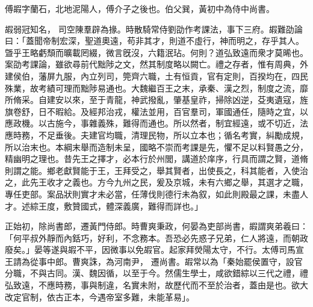 \begin{pinyinscope}
 
 
 傅嘏字蘭石，北地泥陽人，傅介子之後也。伯父巽，黃初中為侍中尚書。
 
 
 嘏弱冠知名，
 司空陳羣辟為掾。時散騎常侍劉劭作考課法，事下三府。嘏難劭論曰：「蓋聞帝制宏深，聖道奧遠，苟非其才，則道不虛行，神而明之，存乎其人。曁乎王略虧頹而曠載罔綴，微言旣沒，六籍泯玷。何則？道弘致遠而衆才莫晞也。案劭考課論，雖欲尋前代黜陟之文，然其制度略以闕亡。禮之存者，惟有周典，外建侯伯，藩屏九服，內立列司，筦齊六職，土有恒貢，官有定則，百揆均在，四民殊業，故考績可理而黜陟易通也。大魏繼百王之末，承秦、漢之烈，制度之流，靡所脩采。自建安以來，至于青龍，神武撥亂，肇基皇祚，掃除凶逆，芟夷遺寇，旌旗卷舒，日不暇給。及經邦治戎，權法並用，百官羣司，軍國通任，隨時之宜，以應政機。以古施今，事雜義殊，難得而通也。所以然者，制宜經遠，或不切近，法應時務，不足垂後。夫建官均職，清理民物，所以立本也；循名考實，糾勵成規，所以治末也。本綱末舉而造制未呈，國略不崇而考課是先，懼不足以料賢愚之分，精幽明之理也。昔先王之擇才，必本行於州閭，講道於庠序，行具而謂之賢，道脩則謂之能。鄉老獻賢能于王，王拜受之，舉其賢者，出使長之，科其能者，入使治之，此先王收才之義也。方今九州之民，爰及京城，未有六鄉之舉，其選才之職，專任吏部。案品狀則實才未必當，任薄伐則德行未為叙，如此則殿最之課，未盡人才。述綜王度，敷贊國式，體深義廣，難得而詳也。」
 
 
正始初，除尚書郎，遷黃門侍郎。時曹爽秉政，何晏為吏部尚書，嘏謂爽弟羲曰：「何平叔外靜而內銛巧，好利，不念務本。吾恐必先惑子兄弟，仁人將遠，而朝政廢矣。」晏等遂與嘏不平，因微事以免嘏官。起家拜熒陽太守，不行。太傅司馬宣王請為從事中郎。曹爽誅，為河南尹，
 遷尚書。嘏常以為「秦始罷侯置守，設官分職，不與古同。漢、魏因循，以至于今。然儒生學士，咸欲錯綜以三代之禮，禮弘致遠，不應時務，事與制違，名實未附，故歷代而不至於治者，蓋由是也。欲大改定官制，依古正本，今遇帝室多難，未能革易」。
 

\end{pinyinscope}
